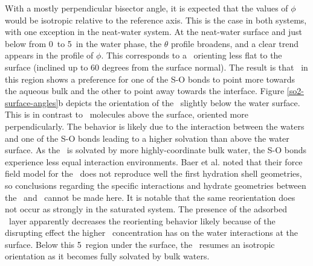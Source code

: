   With a mostly perpendicular bisector angle, it is expected that the values of $\phi$ would be isotropic relative to the reference axis. This is the case in both systems, with one exception in the neat-water system. At the neat-water surface and just below from 0\angs~to 5\angs~in the water phase, the $\theta$ profile broadens, and a clear trend appears in the profile of $\phi$. This corresponds to a \suldiox~orienting less flat to the surface (inclined up to 60 degrees from the surface normal). The result is that \suldiox~in this region shows a preference for one of the S-O bonds to point more towards the aqueous bulk and the other to point away towards the interface. Figure \ref{so2-surface-angles}b depicts the orientation of the \suldiox~slightly below the water surface. This is in contrast to \suldiox~molecules above the surface, oriented more perpendicularly. The behavior is likely due to the interaction between the waters and one of the S-O bonds leading to a higher solvation than above the water surface. As the \suldiox~is solvated by more highly-coordinate bulk water, the S-O bonds experience less equal interaction environments. Baer et al. noted that their force field model for the \suldiox~does not reproduce well the first hydration shell geometries,\cite{Baer2010} so conclusions regarding the specific interactions and hydrate geometries between the \suldiox~and \wat~cannot be made here. It is notable that the same reorientation does not occur as strongly in the saturated system. The presence of the adsorbed \suldiox~layer apparently decreases the reorienting behavior likely because of the disrupting effect the higher \suldiox~concentration has on the water interactions at the surface. Below this 5\angs~region under the surface, the \suldiox~resumes an isotropic orientation as it becomes fully solvated by bulk waters.


